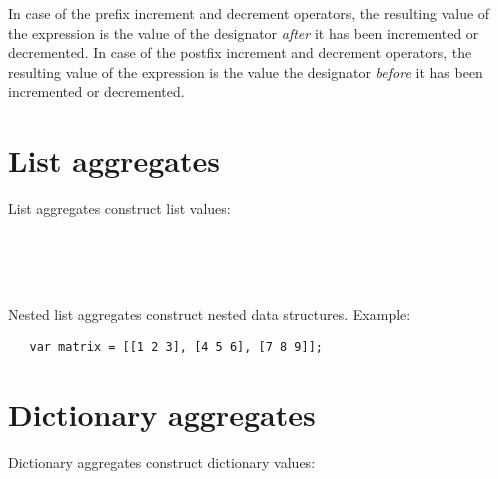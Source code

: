 \noindent
In case of the prefix increment and decrement operators,
the resulting value of the expression is the value of
the designator \emph{after} it has been incremented or decremented.
In case of the postfix increment and decrement operators,
the resulting value of the expression is the value
the designator \emph{before} it has been incremented or decremented.

\section{List aggregates}

List aggregates construct list values:

\begin{grammar}
      \produces \lextoken{\leftbracketSY} \lextoken{\rightbracketSY} \\
      \produces \lextoken{\leftbracketSY}
          \lextoken{\rightbracketSY} \\
      \produces {} \\
      \produces {} \lextoken{,}
\end{grammar}

\noindent
Nested list aggregates construct nested data structures. Example:

\begin{lstlisting}
   var matrix = [[1 2 3], [4 5 6], [7 8 9]];
\end{lstlisting}

\section{Dictionary aggregates}

Dictionary aggregates construct dictionary values:

\begin{grammar}
      \produces \lextoken{\{} \lextoken{\}} \\
      \produces \lextoken{\{}  \lextoken{\}} \\
      \produces \lextoken{\{} 
         \lextoken{,} \lextoken{\}} \\
      \produces {} \\
      \produces {} \lextoken{,}
          \\
      \produces {} \lextoken{->}
          \\
      \produces {} \lextoken{->}
\end{grammar}

